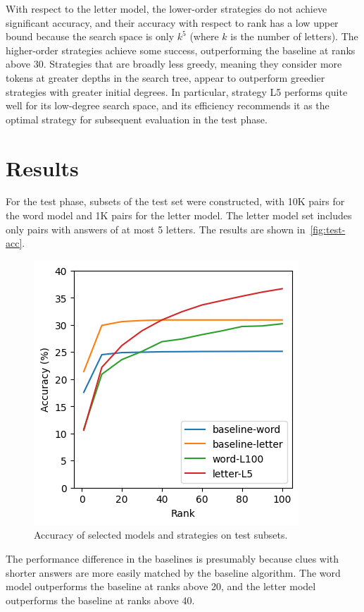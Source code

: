 \documentclass[letterpaper]{article} %
\begin{document}
\begin{NoHyper}
With respect to the letter model, the lower-order strategies do not achieve significant accuracy, and their accuracy with respect to rank has a low upper bound because the search space is only $k^5$ (where $k$ is the number of letters).
The higher-order strategies achieve some success,  outperforming the baseline at ranks above 30.
Strategies that are broadly less greedy, meaning they consider more tokens at greater depths in the search tree, appear to outperform greedier strategies with greater initial degrees.
In particular, strategy L5 performs quite well for its low-degree search space, and its efficiency recommends it as the optimal strategy for subsequent evaluation in the test phase.

\section{Results}
\label{sec:results}

For the test phase, subsets of the test set were constructed, with 10K pairs
for the word model and 1K pairs for the letter model.
The letter model set includes only pairs with answers of at most 5 letters.
The results are shown in~\autoref{fig:test-acc}.

\begin{figure}
\centering
\includegraphics[width=0.75\columnwidth]{fig-test-acc}
\caption{Accuracy of selected models and strategies on test subsets.}
\label{fig:test-acc}
\end{figure}

The performance difference in the baselines is presumably because clues with
shorter answers are more easily matched by the baseline algorithm.
The word model outperforms the baseline at ranks above 20, and the letter model
outperforms the baseline at ranks above 40.


\end{NoHyper}
\end{document}

